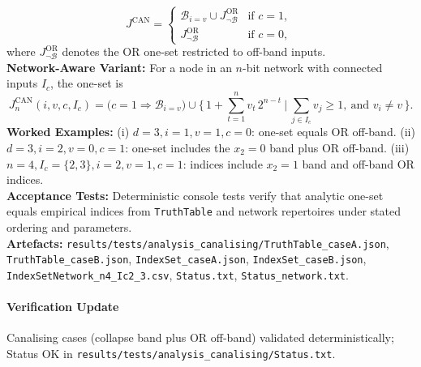 \documentclass{article}
\begin{document}
\[
J^{\mathrm{CAN}} = \begin{cases}
 \mathcal{B}_{i=v} \cup J^{\mathrm{OR}}_{\neg \mathcal{B}} & \text{if } c=1,\\
 J^{\mathrm{OR}}_{\neg \mathcal{B}} & \text{if } c=0,\
\end{cases}
\]
where \(J^{\mathrm{OR}}_{\neg \mathcal{B}}\) denotes the \(\mathrm{OR}\) one-set restricted to off-band inputs.\\
\textbf{Network-Aware Variant:} For a node in an \(n\)-bit network with connected inputs \(I_c\), the one-set is
\[
J^{\mathrm{CAN}}_{n}(i,v,c,I_c) = \Big( c=1 \Rightarrow \mathcal{B}_{i=v} \Big) \cup \Big\{\, 1 + \sum_{t=1}^{n} v_t\,2^{n-t} \ \Big| \ \sum_{j\in I_c} v_j \ge 1,\ \text{and } v_i \ne v\,\Big\}.
\]
\textbf{Worked Examples:} (i) \(d=3, i=1, v=1, c=0\): one-set equals \(\mathrm{OR}\) off-band. (ii) \(d=3, i=2, v=0, c=1\): one-set includes the \(x_2=0\) band plus \(\mathrm{OR}\) off-band. (iii) \(n=4, I_c=\{2,3\}, i=2, v=1, c=1\): indices include \(x_2=1\) band and off-band \(\mathrm{OR}\) indices.\\
\textbf{Acceptance Tests:} Deterministic console tests verify that analytic one-set equals empirical indices from \texttt{TruthTable} and network repertoires under stated ordering and parameters.\\
\textbf{Artefacts:} \texttt{results/tests/analysis\_canalising/TruthTable\_caseA.json}, \texttt{TruthTable\_caseB.json}, \texttt{IndexSet\_caseA.json}, \texttt{IndexSet\_caseB.json}, \texttt{IndexSetNetwork\_n4\_Ic2\_3.csv}, \texttt{Status.txt}, \texttt{Status\_network.txt}.
\paragraph{Verification Update} Canalising cases (collapse band plus OR off-band) validated deterministically; Status OK in \texttt{results/tests/analysis\_canalising/Status.txt}.
\end{document}
